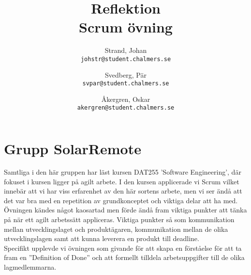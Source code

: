 \documentclass[a4paper]{article}
\author{
	Strand, Johan \\ \texttt{johstr@student.chalmers.se} \and
	Svedberg, Pär\\ \texttt{svpar@student.chalmers.se} \and
	Åkergren, Oskar\\ \texttt{akergren@student.chalmers.se}
}
\title{\vspace{-3.5cm}Reflektion \\ Scrum övning}
\begin{document}
	\maketitle
	\section*{Grupp SolarRemote} %
	\label{sec:grupp_solarremote}
	Samtliga i den här gruppen har läst kursen DAT255 ’Software Engineering’, där fokuset i kursen ligger på agilt arbete. I den kursen applicerade vi Scrum vilket innebär att vi har viss erfarenhet av den här sortens arbete, men vi ser ändå att det var bra med en repetition av grundkonceptet och viktiga delar att ha med. \\

	\noindent Övningen kändes något kaosartad men förde ändå fram viktiga punkter att tänka på när ett agilt arbetssätt appliceras. Viktiga punkter så som kommunikation mellan utvecklingslaget och produktägaren, kommunikation mellan de olika  utvecklingslagen samt att kunna leverera en produkt till deadline. \\

	\noindent Specifikt upplevde vi övningen som givande för att skapa en förståelse för att ta fram en ''Definition of Done'' och att formellt tilldela arbetsuppgifter till de olika lagmedlemmarna.
	

\end{document}
